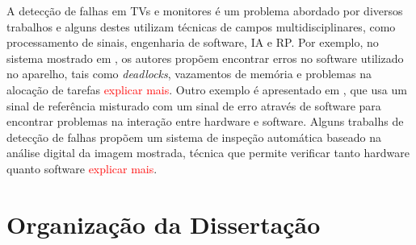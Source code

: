 A detecção de falhas em TVs e monitores é um problema abordado por diversos trabalhos e alguns destes utilizam técnicas de campos multidisciplinares, como processamento de sinais, engenharia de software, IA e RP. Por exemplo, no sistema mostrado em \cite{inspectsoftware}, os autores propõem encontrar erros no software utilizado no aparelho, tais como \textit{deadlocks}, vazamentos de memória e problemas na alocação de tarefas \textcolor{red}{explicar mais}. Outro exemplo é apresentado em \cite{inspecthardsoft}, que usa um sinal de referência misturado com um sinal de erro através de software para encontrar problemas na interação entre hardware e software. Alguns trabalhs de detecção de falhas propõem um sistema de inspeção automática baseado na análise digital da imagem mostrada, técnica que permite verificar tanto hardware quanto software \cite{inspect,inspectimage00,inspectimage01,inspectimage02,inspectgrabber} \textcolor{red}{explicar mais}.
 
 \section{Organização da Dissertação}
 
